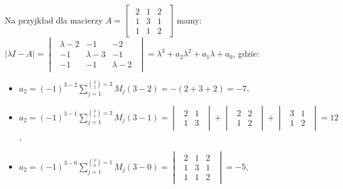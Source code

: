 \documentclass{article}
\begin{document}
\begin{enumerate}
        Na przyjkład dla macierzy $A = \begin{bmatrix}\begin{array}{rrr} 2 & 1 & 2\\ 1 & 3 & 1\\ 1 & 1 & 2 \end{array}\end{bmatrix}$ mamy:
        $|\lambda I - A| = \begin{vmatrix}\begin{array}{rrr} \lambda - 2 & -1 & -2\\ -1 & \lambda - 3 & -1\\ -1 & -1 & \lambda - 2 \end{array}\end{vmatrix} = \lambda^{3} + a_{2}\lambda^{2} + a_{1}\lambda + a_{0}$, gdzie:
        \begin{itemize}
            \item $a_{2} = (-1)^{3-2} \sum_{j=1}^{{{3}\choose{2}}=3}{M_{j}(3-2)} = -(2 + 3 + 2) = -7$,
            \item $a_{2} = (-1)^{3-1} \sum_{j=1}^{{{3}\choose{1}}=3}{M_{j}(3-1)} = \begin{vmatrix}\begin{array}{rr} 2 & 1\\ 1 & 3 \end{array}\end{vmatrix} + \begin{vmatrix}\begin{array}{rr} 2 & 2\\ 1 & 2 \end{array}\end{vmatrix} + \begin{vmatrix}\begin{array}{rr} 3 & 1\\ 1 & 2 \end{array}\end{vmatrix} = 12$,
            \item $a_{2} = (-1)^{3-0} \sum_{j=1}^{{{3}\choose{0}}=1}{M_{j}(3-0)} = \begin{vmatrix}\begin{array}{rrr} 2 & 1 & 2\\ 1 & 3 & 1\\ 1 & 1 & 2 \end{array}\end{vmatrix} = -5$,
        \end{itemize}


\end{enumerate}
\end{document}
